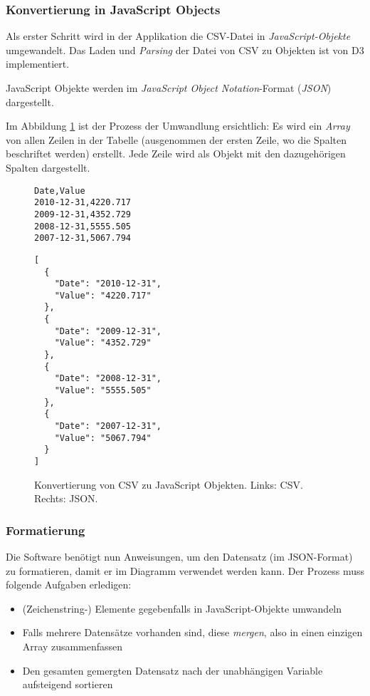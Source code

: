 \subsubsection{Konvertierung in JavaScript Objects}

Als erster Schritt wird in der Applikation die CSV-Datei in \textit{JavaScript-Objekte} umgewandelt. Das Laden und \textit{Parsing} der Datei von CSV zu Objekten ist von D3 implementiert.

JavaScript Objekte werden im \textit{JavaScript Object Notation}-Format (\textit{JSON}) dargestellt.

Im Abbildung \ref{fig:csv-json} ist der Prozess der Umwandlung ersichtlich: Es wird ein \textit{Array} von allen Zeilen in der Tabelle (ausgenommen der ersten Zeile, wo die Spalten beschriftet werden) erstellt. Jede Zeile wird als Objekt mit den dazugehörigen Spalten dargestellt.

\begin{figure}[!htbp]
	\centering
	\begin{minipage}{0.35\textwidth}
		\centering
		\begin{verbatim}
Date,Value
2010-12-31,4220.717
2009-12-31,4352.729
2008-12-31,5555.505
2007-12-31,5067.794
		\end{verbatim}
	\end{minipage}\hfill
	\begin{minipage}{0.55\textwidth}
		\centering

		\begin{verbatim}
[
  {
    "Date": "2010-12-31",
    "Value": "4220.717"
  },
  {
    "Date": "2009-12-31",
    "Value": "4352.729"
  },
  {
    "Date": "2008-12-31",
    "Value": "5555.505"
  },
  {
    "Date": "2007-12-31",
    "Value": "5067.794"
  }
]
		\end{verbatim}
	\end{minipage}
	\caption[CSV und JSON]{Konvertierung von CSV zu JavaScript Objekten. Links: CSV. Rechts: JSON.}
	\label{fig:csv-json}
\end{figure}

\subsubsection{Formatierung}

Die Software benötigt nun Anweisungen, um den Datensatz (im JSON-Format) zu formatieren, damit er im Diagramm verwendet werden kann. Der Prozess muss folgende Aufgaben erledigen:

\begin{itemize}
	\item (Zeichenstring-) Elemente gegebenfalls in JavaScript-Objekte umwandeln
	\item Falls mehrere Datensätze vorhanden sind, diese \textit{mergen}, also in einen einzigen Array zusammenfassen
	\item Den gesamten gemergten Datensatz nach der unabhängigen Variable aufsteigend sortieren
\end{itemize}

